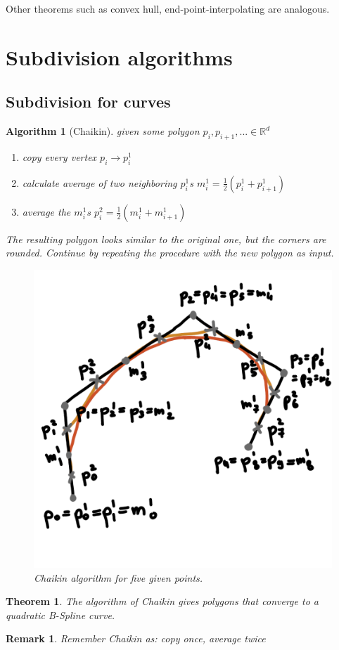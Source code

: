 \documentclass[]{article}
\newtheorem{theorem}{Theorem}
\newtheorem{algorithm}{Algorithm}
\newtheorem{remark}{Remark}
\begin{document}
Other theorems such as convex hull, end-point-interpolating are analogous.

\section{Subdivision algorithms}

\subsection{Subdivision for curves}

\begin{algorithm}[Chaikin]
	given some polygon $p_i, p_{i+1}, ... \in \mathbb{R}^d$
	
	\begin{enumerate}
		\item copy every vertex $p_i \rightarrow p_i^1$
		\item calculate average of two neighboring $p_i^1$s $m_i^1 = \frac{1}{2}(p_i^1 + p_{i+1}^1)$
		\item average the $m_i^1$s $p_i^2 = \frac{1}{2}(m_i^1 + m_{i+1}^1)$
	\end{enumerate}
	
	The resulting polygon looks similar to the original one, but the corners are rounded. Continue by repeating the procedure with the new polygon as input.
	
	\begin{figure}[h!]
		\centering
		\includegraphics[width=0.3\linewidth]{figures/chaikin}
		\caption{Chaikin algorithm for five given points.}
		\label{fig:chaikin}
	\end{figure}
	
\end{algorithm}

\begin{theorem}
	The algorithm of Chaikin gives polygons that converge to a quadratic B-Spline curve.
\end{theorem}

\begin{remark}
	Remember Chaikin as: copy once, average twice
\end{remark}
\end{document}
